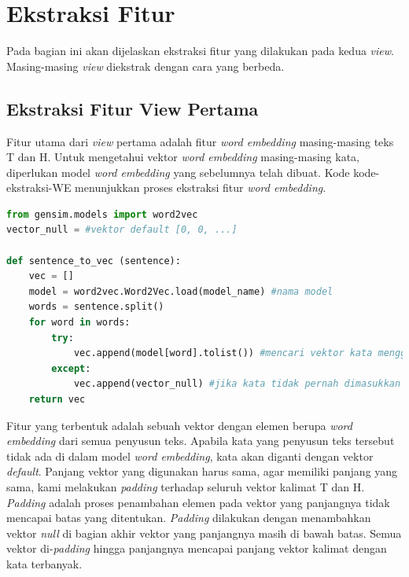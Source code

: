 \section{Ekstraksi Fitur}
Pada bagian ini akan dijelaskan ekstraksi fitur yang dilakukan pada kedua \textit{view}. Masing-masing \textit{view} diekstrak dengan cara yang berbeda. 

\subsection{Ekstraksi Fitur View Pertama}
Fitur utama dari \textit{view} pertama adalah fitur \textit{word embedding} masing-masing teks T dan H. Untuk mengetahui vektor \textit{word embedding} masing-masing kata, diperlukan model \textit{word embedding} yang sebelumnya telah dibuat. Kode {kode-ekstraksi-WE} menunjukkan proses ekstraksi fitur \textit{word embedding}.
\begin{lstlisting}[language=Python, caption={Ekstraksi Fitur \textit{word embedding}}, label={kode-ekstraksi-WE}]
from gensim.models import word2vec
vector_null = #vektor default [0, 0, ...]

def sentence_to_vec (sentence):
	vec = []
	model = word2vec.Word2Vec.load(model_name) #nama model
	words = sentence.split()
	for word in words:
		try:
			vec.append(model[word].tolist()) #mencari vektor kata menggunakan model
		except:
			vec.append(vector_null) #jika kata tidak pernah dimasukkan ke model, gunakan vektor default
	return vec
\end{lstlisting}
Fitur yang terbentuk adalah sebuah vektor dengan elemen berupa \textit{word embedding}  dari semua penyusun teks. Apabila kata yang penyusun teks tersebut tidak ada di dalam model \textit{word embedding}, kata akan diganti dengan vektor \textit{default}. Panjang vektor yang digunakan harus sama, agar memiliki panjang yang sama, kami melakukan \textit{padding} terhadap seluruh vektor kalimat T dan H. \textit{Padding} adalah proses penambahan elemen pada vektor yang panjangnya tidak mencapai batas yang ditentukan. \textit{Padding} dilakukan dengan menambahkan vektor \textit{null} di bagian akhir vektor yang panjangnya masih di bawah batas. Semua vektor di-\textit{padding} hingga panjangnya mencapai panjang vektor kalimat dengan kata terbanyak.  


